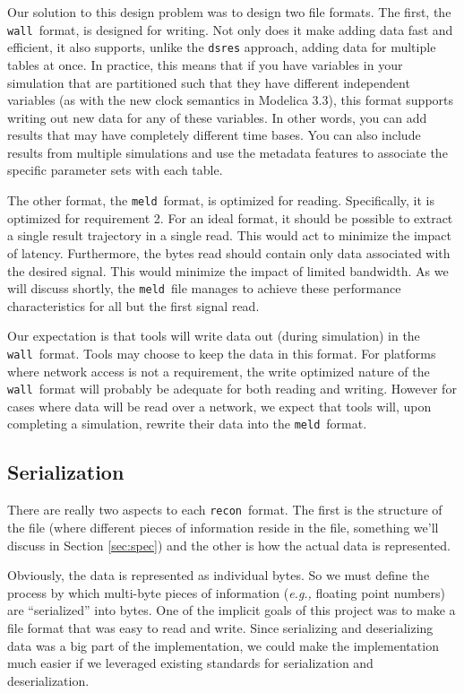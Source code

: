 \documentclass[11pt,a4paper,twocolumn]{article}
\newcommand{\recon}{\texttt{recon}}
\newcommand{\wall}{\texttt{wall}}
\newcommand{\meld}{\texttt{meld}}
\newcommand{\code}[1]{\texttt{#1}} %
\begin{document}

Our solution to this design problem was to design two file formats.
The first, the \wall\ format, is designed for writing.  Not only does
it make adding data fast and efficient, it also supports, unlike the
\code{dsres} approach, adding data for multiple tables at once.  In
practice, this means that if you have variables in your simulation
that are partitioned such that they have different independent
variables (as with the new clock semantics in Modelica 3.3), this
format supports writing out new data for any of these variables.  In
other words, you can add results that may have completely different
time bases.  You can also include results from multiple simulations
and use the metadata features to associate the specific parameter sets
with each table.

The other format, the \meld\ format, is optimized for reading.
Specifically, it is optimized for requirement 2.  For an ideal
format, it should be possible to extract a single result trajectory in
a single read.  This would act to minimize the impact of latency.
Furthermore, the bytes read should contain only data associated with
the desired signal.  This would minimize the impact of limited
bandwidth.  As we will discuss shortly, the \meld\ file manages to
achieve these performance characteristics for all but the first signal
read.

Our expectation is that tools will write data out (during simulation)
in the \wall\ format.  Tools may choose to keep the data in this
format.  For platforms where network access is not a requirement, the
write optimized nature of the \wall\ format will probably be adequate
for both reading and writing.  However for cases where data will be
read over a network, we expect that tools will, upon completing a
simulation, rewrite their data into the \meld\ format.

\subsection{Serialization}


There are really two aspects to each \recon\ format.  The first is the
structure of the file (where different pieces of information reside in
the file, something we'll discuss in Section \ref{sec:spec}) and the
other is how the actual data is represented.

Obviously, the data is represented as individual bytes.  So we must
define the process by which multi-byte pieces of information
(\textit{e.g.,} floating point numbers) are ``serialized'' into bytes.
One of the implicit goals of this project was to make a file format
that was easy to read and write.  Since serializing and deserializing
data was a big part of the implementation, we could make the
implementation much easier if we leveraged existing standards for
serialization and deserialization.
\end{document}
